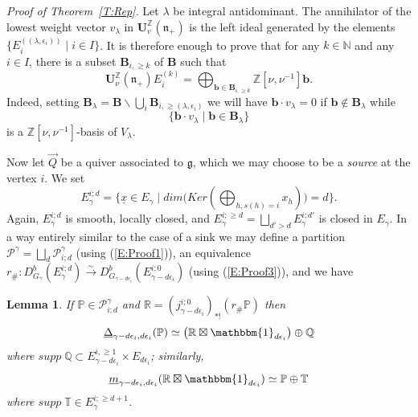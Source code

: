 \documentclass[a4paper,10pt]{amsart}
\def\Z{\mathbb{Z}}
\def\U{\mathbf{U}}
\def\N{\mathbb{N}}
\def\g{\mathfrak{g}}
\def\n{\mathfrak{n}}
\newtheorem{lem}[theo]{Lemma}
\numberwithin{equation}{section}
\begin{document}
\vspace{.15in}

\noindent
\textit{Proof of Theorem~\ref{T:Rep}.} Let $\lambda$ be integral antidominant. The annihilator of the lowest weight vector $v_{\lambda}$ in $\U_v^{\Z}(\n_+)$ is the left ideal generated by the elements $\{E_i^{((\lambda, \epsilon_i))}\;|\; i \in I\}$. It is therefore enough to prove that for any $k \in \N$ and any $i \in I$, there is a subset $\mathbf{B}_{i, \geq k}$ of $\mathbf{B}$ such that
$$\U_{\nu}^{\Z}(\n_+) E_i^{(k)} =\bigoplus_{\mathbf{b} \in \mathbf{B}_{i,\geq k}} \Z[\nu,\nu^{-1}] \mathbf{b}.$$
Indeed, setting $\mathbf{B}_{\lambda}=\mathbf{B} \backslash \bigcup_i \mathbf{B}_{i, \geq (\lambda,\epsilon_i)}$ we will have
$\mathbf{b} \cdot v_{\lambda}=0$ if $\mathbf{b} \not\in \mathbf{B}_{\lambda}$ while 
$$\big\{ \mathbf{b} \cdot v_{\lambda}\;|\; \mathbf{b} \in \mathbf{B}_{\lambda} \big\}$$ is a $\Z[\nu,\nu^{-1}]$-basis of $V_{\lambda}$. 

\vspace{.1in}

Now let $\vec{Q}$ be a quiver associated to $\g$, which we may choose to be a \textit{source} at the vertex $i$. We set
$$E_{\gamma}^{i;d}=\big\{ \underline{x} \in E_{\gamma}\;|\; dim \big( Ker ( \bigoplus_{h, s(h)=i} x_h)\big)=d\big\}.$$
Again, $E_{\gamma}^{i;d}$ is smooth, locally closed, and $E_{\gamma}^{i; \geq d}=\bigsqcup_{d'>d} E_{\gamma}^{i;d'}$ is closed in $E_{\gamma}$. In a way entirely similar to the case of a sink we may define a partition $\mathcal{P}^{\gamma}=\bigsqcup_{d} \mathcal{P}^{\gamma}_{i;d}$ (using (\ref{E:Proof1})), an equivalence $r_{\#}: D^b_{G_{\gamma}}(E^{i;d}_{\gamma}) \stackrel{\sim}{\to} D^b_{G_{\gamma-d\epsilon_i}}(E^{i;0}_{\gamma-d\epsilon_i})$ (using (\ref{E:Proof3})), and we have

\vspace{.1in}

\begin{lem}\label{L:Proofkey2} If $\mathbb{P} \in \mathcal{P}^{\gamma}_{i;d}$ and $\mathbb{R}=(j_{\gamma-d\epsilon_i}^{i;0})_{*!}(r_{\#}\mathbb{P})$ then
\begin{equation}\label{E:Proof4bis}
\underline{\Delta}_{ \gamma-d\epsilon_i,d\epsilon_i}(\mathbb{P}) \simeq \big( \mathbb{R}\boxtimes \mathbbm{1}_{d\epsilon_i} \big) \oplus \mathbb{Q}
\end{equation}
where $supp\; \mathbb{Q} \subset E_{\gamma-d\epsilon_i}^{i, \geq 1} \times  E_{d\epsilon_i} $; similarly,
\begin{equation}\label{E:Proof5bis}
\underline{m}_{ \gamma-d\epsilon_i,d\epsilon_i}( \mathbb{R}\boxtimes \mathbbm{1}_{d\epsilon_i}) \simeq \mathbb{P} \oplus \mathbb{T}
\end{equation}
where $supp\;\mathbb{T} \in E_{\gamma}^{i;\geq d+1}$.
\end{lem}
\end{document}
